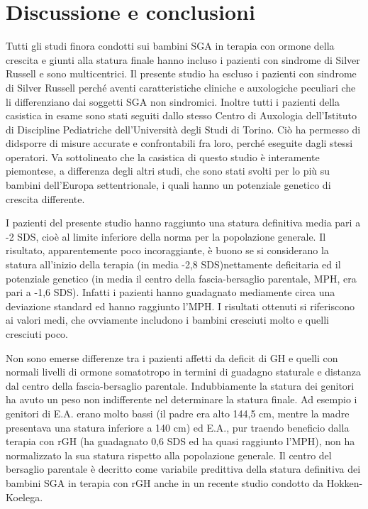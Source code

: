 \chapter{Discussione e conclusioni}


Tutti gli studi finora condotti sui bambini SGA in terapia con ormone della crescita e giunti alla statura finale hanno incluso i pazienti con sindrome di Silver Russell e sono multicentrici. Il presente studio ha escluso i pazienti con sindrome di Silver Russell perché aventi caratteristiche cliniche e auxologiche peculiari che li differenziano dai soggetti SGA non sindromici. Inoltre tutti i pazienti della casistica in esame sono stati seguiti dallo stesso Centro di Auxologia dell'Istituto di Discipline Pediatriche dell'Università degli Studi di Torino. Ciò ha permesso di didsporre di misure accurate e confrontabili fra loro, perché eseguite dagli stessi operatori. Va sottolineato che la casistica di questo studio è interamente piemontese, a differenza degli altri studi, che sono stati svolti per lo più su bambini dell'Europa settentrionale, i quali hanno un potenziale genetico di crescita differente.

I pazienti del presente studio hanno raggiunto una statura definitiva media pari a -2 SDS, cioè al limite inferiore della norma per la popolazione generale. Il risultato, apparentemente poco incoraggiante, è buono se si considerano la statura all'inizio della terapia (in media -2,8 SDS)nettamente deficitaria ed il potenziale genetico (in media il centro della fascia-bersaglio parentale, MPH, era pari a -1,6 SDS). Infatti i pazienti hanno guadagnato mediamente circa una deviazione standard ed hanno raggiunto l'MPH. I risultati ottenuti si riferiscono ai valori medi, che ovviamente includono i bambini cresciuti molto e quelli cresciuti poco. 

Non sono emerse differenze tra i pazienti affetti da deficit di GH e quelli con normali livelli di ormone somatotropo in termini di guadagno staturale e distanza dal centro della fascia-bersaglio parentale. Indubbiamente la statura dei genitori ha avuto un peso non indifferente nel determinare la statura finale. Ad esempio i genitori di E.A. erano molto bassi (il padre era alto 144,5 cm, mentre la madre presentava una statura inferiore a 140 cm) ed E.A., pur traendo beneficio dalla terapia con rGH (ha guadagnato 0,6 SDS ed ha quasi raggiunto l'MPH), non ha normalizzato la sua statura rispetto alla popolazione generale.
Il centro del bersaglio parentale è decritto come variabile predittiva della statura definitiva dei bambini SGA in terapia con rGH anche in un recente studio condotto da Hokken-Koelega\cite{de2008prediction}.

